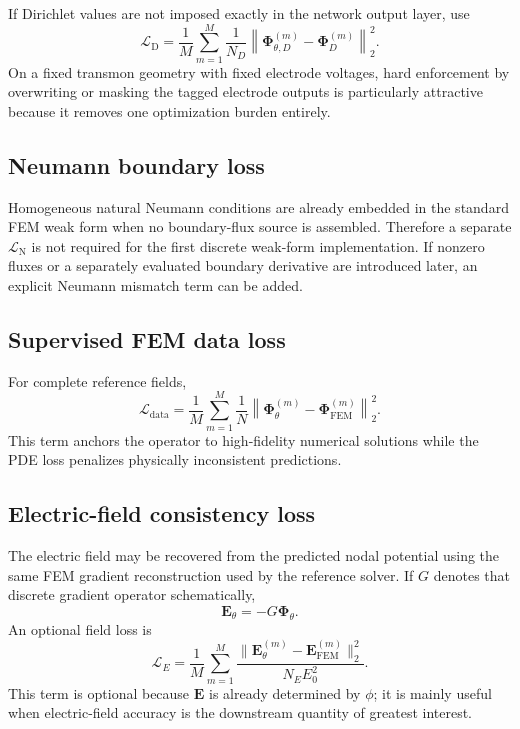 \documentclass[11pt]{article}
\newcommand{\Evec}{\mathbf{E}}
\newcommand{\Ldata}{\mathcal{L}_{\mathrm{data}}}
\newcommand{\Ldir}{\mathcal{L}_{\mathrm{D}}}
\newcommand{\Lneu}{\mathcal{L}_{\mathrm{N}}}
\newcommand{\LE}{\mathcal{L}_{E}}
\begin{document}
If Dirichlet values are not imposed exactly in the network output layer, use
\begin{equation}
\Ldir
=\frac{1}{M}\sum_{m=1}^{M}
\frac{1}{N_D}\left\|
\bm{\Phi}_{\theta,D}^{(m)}-\bm{\Phi}_D^{(m)}
\right\|_2^2.
\end{equation}
On a fixed transmon geometry with fixed electrode voltages, hard enforcement by overwriting or masking the tagged electrode outputs is particularly attractive because it removes one optimization burden entirely.

\subsection{Neumann boundary loss}

Homogeneous natural Neumann conditions are already embedded in the standard FEM weak form when no boundary-flux source is assembled. Therefore a separate $\Lneu$ is not required for the first discrete weak-form implementation. If nonzero fluxes or a separately evaluated boundary derivative are introduced later, an explicit Neumann mismatch term can be added.

\subsection{Supervised FEM data loss}

For complete reference fields,
\begin{equation}
\Ldata
=\frac{1}{M}\sum_{m=1}^{M}
\frac{1}{N}\left\|
\bm{\Phi}_{\theta}^{(m)}-\bm{\Phi}_{\mathrm{FEM}}^{(m)}
\right\|_2^2.
\end{equation}
This term anchors the operator to high-fidelity numerical solutions while the PDE loss penalizes physically inconsistent predictions.

\subsection{Electric-field consistency loss}

The electric field may be recovered from the predicted nodal potential using the same FEM gradient reconstruction used by the reference solver. If $G$ denotes that discrete gradient operator schematically,
\begin{equation}
\Evec_{\theta}=-G\bm{\Phi}_{\theta}.
\end{equation}
An optional field loss is
\begin{equation}
\LE=\frac{1}{M}\sum_{m=1}^{M}
\frac{\|\Evec_{\theta}^{(m)}-\Evec_{\mathrm{FEM}}^{(m)}\|_2^2}
{N_E E_0^2}.
\end{equation}
This term is optional because $\Evec$ is already determined by $\phi$; it is mainly useful when electric-field accuracy is the downstream quantity of greatest interest.
\end{document}
